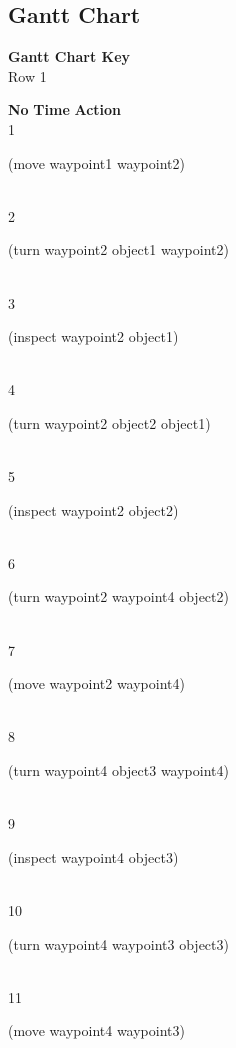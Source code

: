 \documentclass[a4paper,12pt]{article}
\newcommand{\action}[1]{{\sf #1}}
\newcommand{\listrowg}[1]{\begin{minipage}[t]{10cm} #1 \end{minipage}}
\begin{document}
\subsection{Gantt Chart}
{\bf Gantt Chart Key}\\
Row 1
\begin{tabbing}
{\bf No} \qquad \= {\bf Time} \qquad \= {\bf Action} \\
1  \> \listrowg{\action{(move waypoint1 waypoint2)}} \\
2  \> \listrowg{\action{(turn waypoint2 object1 waypoint2)}} \\
3  \> \listrowg{\action{(inspect waypoint2 object1)}} \\
4  \> \listrowg{\action{(turn waypoint2 object2 object1)}} \\
5  \> \listrowg{\action{(inspect waypoint2 object2)}} \\
6  \> \listrowg{\action{(turn waypoint2 waypoint4 object2)}} \\
7  \> \listrowg{\action{(move waypoint2 waypoint4)}} \\
8  \> \listrowg{\action{(turn waypoint4 object3 waypoint4)}} \\
9  \> \listrowg{\action{(inspect waypoint4 object3)}} \\
10  \> \listrowg{\action{(turn waypoint4 waypoint3 object3)}} \\
11  \> \listrowg{\action{(move waypoint4 waypoint3)}} \\
\end{tabbing}
\end{document}
